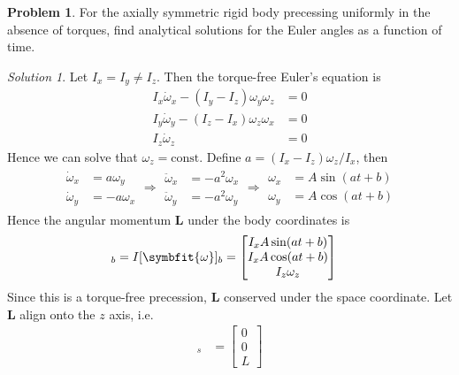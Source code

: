 \documentclass[twoside,11pt]{article}
\newcommand{\lms}{\fontfamily{lmss}\selectfont} %
\theoremstyle{definition}
\newtheorem{problem}{\lms Problem}
\theoremstyle{remark}
\newtheorem*{solution}{Solution}
\begin{document}
\begin{problem}
For the axially symmetric rigid body precessing uniformly in the absence of 
torques, find analytical solutions for the Euler angles as a function of time.
\end{problem}
\begin{solution}
Let $I_x=I_y\neq I_z$.
Then the torque-free Euler's equation is
\begin{align*}
    I_x\dot\omega_x - (I_y-I_z)\omega_y\omega_z &= 0\\
    I_y\dot\omega_y - (I_z-I_x)\omega_z\omega_x &= 0\\
    I_z\dot\omega_z &= 0
\end{align*}
Hence we can solve that $\omega_z=\text{const}$.
Define $a=(I_x-I_z)\omega_z/I_x$, then
\begin{align*}
    \begin{aligned}
        \dot\omega_x &= a\omega_y\\
        \dot\omega_y &= -a\omega_x
    \end{aligned}
    \Rightarrow
    \begin{aligned}
        \ddot\omega_x &= -a^2\omega_x\\
        \ddot\omega_y &= -a^2\omega_y
    \end{aligned}
    \Rightarrow
    \begin{aligned}
        \omega_x &= A\sin(at+b)\\
        \omega_y &= A\cos(at+b)
    \end{aligned}
\end{align*}
Hence the angular momentum $\mathbf{L}$ under the body coordinates is
\begin{align*}
    [\mathbf{L}]_b &= I[\symbfit{\omega}]_b
    = \begin{bmatrix}
        I_x A\sin(at+b)\\
        I_x A\cos(at+b)\\
        I_z\omega_z
    \end{bmatrix}
\end{align*}
Since this is a torque-free precession, $\mathbf{L}$ conserved under
the space coordinate.
Let $\mathbf{L}$ align onto the $z$ axis, i.e.
\begin{align*}
    [\mathbf{L}]_s &= 
    \begin{bmatrix}
        0\\ 0\\ L
    \end{bmatrix}
\end{align*}

\end{solution}
\end{document}

